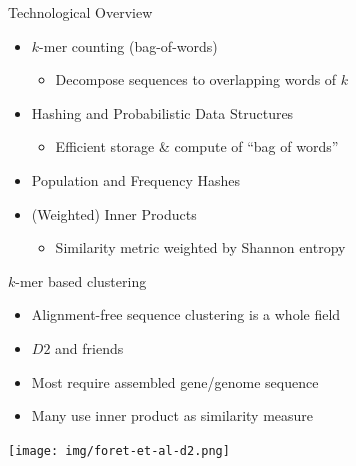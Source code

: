 \documentclass[t]{beamer}
\begin{document}
\begin{frame}{Technological Overview}
  \begin{itemize}
    \item $k$-mer counting (bag-of-words)
    \begin{itemize}
      \item Decompose sequences to overlapping words of $k$
    \end{itemize}
    \pause
    \item Hashing and Probabilistic Data Structures
      \begin{itemize}
        \item Efficient storage \& compute of ``bag of words''
      \end{itemize}
    \pause
    \item Population and Frequency Hashes
    \pause
    \item (Weighted) Inner Products
      \begin{itemize}
        \item Similarity metric weighted by Shannon entropy
      \end{itemize}
  \end{itemize}
\end{frame}


\begin{frame}{$k$-mer based clustering}
  \begin{itemize}
    \item Alignment-free sequence clustering is a whole field
    \item $D2$ and friends
    \item Most require assembled gene/genome sequence
    \item Many use inner product as similarity measure
  \end{itemize}
  \begin{center}
    \texttt{[image: img/foret-et-al-d2.png]}
  \end{center}
\end{frame}
\end{document}
